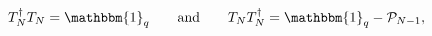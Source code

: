 \begin{equation}
 T_N^\dagger T_N=\mathbbm{1}_q\qquad\text{and}\qquad
 T_NT_N^\dagger=\mathbbm{1}_q-\mathcal{P}_{N-1},
\end{equation}

